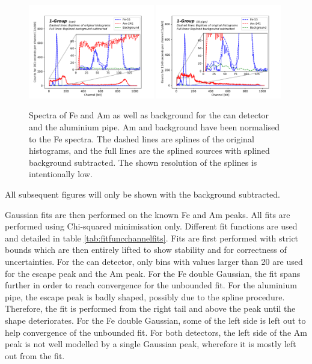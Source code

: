 \begin{figure}[htb]
  \includegraphics[width=0.49\textwidth,page=1]{graphics/bkgsubtraction.pdf}
  \includegraphics[width=0.49\textwidth,page=1]{graphics/alubkgsubtraction.pdf}
  \caption{Spectra of Fe and Am as well as background for the can detector and the aluminium pipe. Am and background have been normalised to the Fe spectra. The dashed lines are splines of the original histograms, and the full lines are the splined sources with splined background subtracted. The shown resolution of the splines is intentionally low.}
  \label{fig:spectra}
\end{figure}

All subsequent figures will only be shown with the background subtracted.

Gaussian fits are then performed on the known Fe and Am peaks. All fits are performed using Chi-squared minimisation only. Different fit functions are used and detailed in table \ref{tab:fitfuncchannelfits}. Fits are first performed with strict bounds which are then entirely lifted to show stability and for correctness of uncertainties. For the can detector, only bins with values larger than 20 are used for the escape peak and the Am peak. For the Fe double Gaussian, the fit spans further in order to reach convergence for the unbounded fit. For the aluminium pipe, the escape peak is badly shaped, possibly due to the spline procedure. Therefore, the fit is performed from the right tail and above the peak until the shape deteriorates. For the Fe double Gaussian, some of the left side is left out to help convergence of the unbounded fit. For both detectors, the left side of the Am peak is not well modelled by a single Gaussian peak, wherefore it is mostly left out from the fit.

